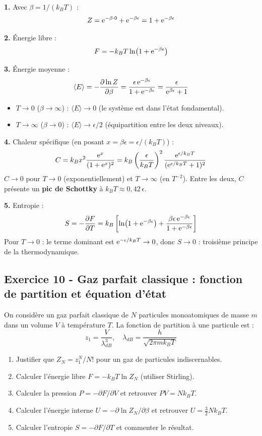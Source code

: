 \documentclass[12pt,a4paper]{article}
\begin{document}
\begin{boitecorrige}
\textbf{1.} Avec $\beta = 1/(k_BT)$ :
\[
Z = \mathrm{e}^{-\beta\cdot 0} + \mathrm{e}^{-\beta\epsilon} = 1 + \mathrm{e}^{-\beta\epsilon}
\]

\textbf{2.} Énergie libre :
\[
F = -k_BT\ln(1+\mathrm{e}^{-\beta\epsilon})
\]

\textbf{3.} Énergie moyenne :
\[
\langle E\rangle = -\frac{\partial\ln Z}{\partial\beta} = \frac{\epsilon\,\mathrm{e}^{-\beta\epsilon}}{1+\mathrm{e}^{-\beta\epsilon}} = \frac{\epsilon}{\mathrm{e}^{\beta\epsilon}+1}
\]
\begin{itemize}
  \item $T\to 0$ ($\beta\to\infty$) : $\langle E\rangle\to 0$ (le système est dans l'état fondamental).
  \item $T\to\infty$ ($\beta\to 0$) : $\langle E\rangle\to\epsilon/2$ (équipartition entre les deux niveaux).
\end{itemize}

\textbf{4.} Chaleur spécifique (en posant $x = \beta\epsilon = \epsilon/(k_BT)$) :
\[
C = k_B x^2\frac{\mathrm{e}^x}{(1+\mathrm{e}^x)^2} = k_B\left(\frac{\epsilon}{k_BT}\right)^2\frac{\mathrm{e}^{\epsilon/k_BT}}{(\mathrm{e}^{\epsilon/k_BT}+1)^2}
\]
$C\to 0$ pour $T\to 0$ (exponentiellement) et $T\to\infty$ (en $T^{-2}$). Entre les deux, $C$ présente un \textbf{pic de Schottky} à $k_BT\approx 0{,}42\,\epsilon$.

\textbf{5.} Entropie :
\[
S = -\frac{\partial F}{\partial T} = k_B\left[\ln(1+\mathrm{e}^{-\beta\epsilon}) + \frac{\beta\epsilon\,\mathrm{e}^{-\beta\epsilon}}{1+\mathrm{e}^{-\beta\epsilon}}\right]
\]
Pour $T\to 0$ : le terme dominant est $\mathrm{e}^{-\epsilon/k_BT}\to 0$, donc $S\to 0$ : troisième principe de la thermodynamique.
\end{boitecorrige}

\subsection*{Exercice 10 - Gaz parfait classique : fonction de partition et équation d'état \niveau{\moyen}}

\begin{boiteexercice}
On considère un gaz parfait classique de $N$ particules monoatomiques de masse $m$ dans un volume $V$ à température $T$. La fonction de partition à une particule est :
\[
z_1 = \frac{V}{\lambda_{dB}^3}, \quad \lambda_{dB} = \frac{h}{\sqrt{2\pi mk_BT}}
\]
\begin{enumerate}
  \item Justifier que $Z_N = z_1^N/N!$ pour un gaz de particules indiscernables.
  \item Calculer l'énergie libre $F = -k_BT\ln Z_N$ (utiliser Stirling).
  \item Calculer la pression $P = -\partial F/\partial V$ et retrouver $PV = Nk_BT$.
  \item Calculer l'énergie interne $U = -\partial\ln Z_N/\partial\beta$ et retrouver $U = \frac{3}{2}Nk_BT$.
  \item Calculer l'entropie $S = -\partial F/\partial T$ et commenter le résultat.
\end{enumerate}
\end{boiteexercice}
\end{document}
